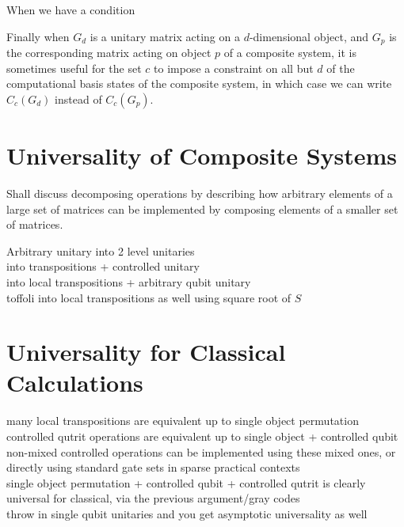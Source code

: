 When we have a condition 

Finally when $G_d$ is a unitary matrix acting on a $d$-dimensional object, and $G_p$ is the corresponding matrix acting on object $p$ of a composite system, it is sometimes useful for the set $c$ to impose a constraint on all but $d$ of the computational basis states of the composite system, in which case we can write $C_c(G_d)$ instead of $C_c(G_p)$.
\section{Universality of Composite Systems}
Shall discuss decomposing operations by describing how arbitrary elements of a large set of matrices can be implemented by composing elements of a smaller set of matrices.

Arbitrary unitary into 2 level unitaries
\\into transpositions + controlled unitary
\\into local transpositions + arbitrary qubit unitary
\\toffoli into local transpositions as well using square root of $S$
\section{Universality for Classical Calculations}
many local transpositions are equivalent up to single object permutation
\\controlled qutrit operations are equivalent up to single object + controlled qubit
\\non-mixed controlled operations can be implemented using these mixed ones, or directly using standard gate sets in sparse practical contexts
\\single object permutation + controlled qubit + controlled qutrit is clearly universal for classical, via the previous argument/gray codes
\\throw in single qubit unitaries and you get asymptotic universality as well
